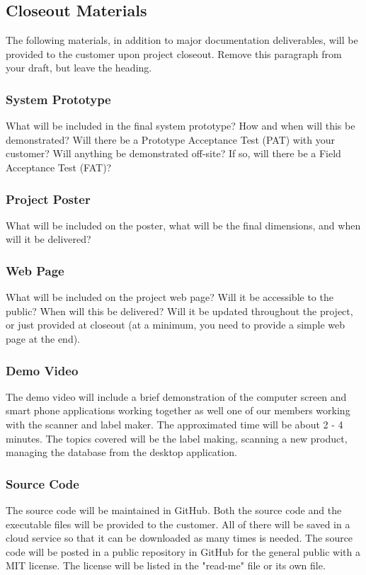 \subsection{Closeout Materials}
The following materials, in addition to major documentation deliverables, will be provided to the customer upon project closeout. Remove this paragraph from your draft, but leave the heading.

\subsubsection{System Prototype}
What will be included in the final system prototype? How and when will this be demonstrated? Will there be a Prototype Acceptance Test (PAT) with your customer? Will anything be demonstrated off-site? If so, will there be a Field Acceptance Test (FAT)?

\subsubsection{Project Poster}
What will be included on the poster, what will be the final dimensions, and when will it be delivered?

\subsubsection{Web Page}
What will be included on the project web page? Will it be accessible to the public? When will this be delivered? Will it be updated throughout the project, or just provided at closeout (at a minimum, you need to provide a simple web page at the end).

\subsubsection{Demo Video}
The demo video will include a brief demonstration of the computer screen and smart phone applications working together as well one of our members working with the scanner and label maker. The approximated time will be about 2 - 4 minutes. The topics covered will be the label making, scanning a new product, managing the database from the desktop application.

\subsubsection{Source Code}
The source code will be maintained in GitHub. Both the source code and the executable files will be provided to the customer. All of there will be saved in a cloud service so that it can be downloaded as many times is needed. The source code will be posted in a public repository in GitHub for the general public with a MIT license. The license will be listed in the "read-me" file or its own file.


